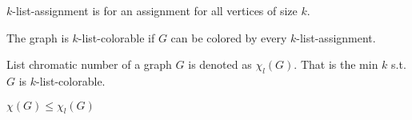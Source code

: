 \begin{defn}
	$k$-list-assignment is for an assignment for all vertices of size $k$.
\end{defn}

\begin{defn}
	The graph is $k$-list-colorable if $G$ can be colored by every $k$-list-assignment.
\end{defn}

\begin{defn}
	List chromatic number of a graph $G$ is denoted as $\chi_l(G)$. That is the min $k$ s.t. $G$ is $k$-list-colorable.
\end{defn}

\begin{observ}
	$\chi(G) \leq \chi_l(G)$
\end{observ}